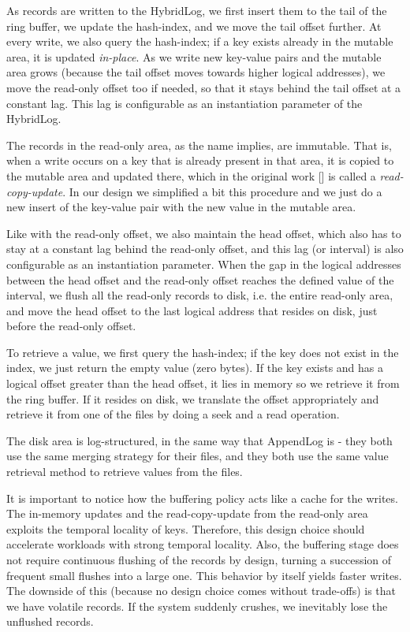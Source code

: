 \vspace{20px}

As records are written to the HybridLog, we first insert them to the tail of the ring buffer, we update the hash-index, and we move the tail offset further.
At every write, we also query the hash-index; if a key exists already in the mutable area, it is updated \textit{in-place}.
As we write new key-value pairs and the mutable area grows (because the tail offset moves towards higher logical addresses), we move the read-only offset too if needed, so that it stays behind the tail offset at a constant lag. This lag is configurable as an instantiation parameter of the HybridLog.

The records in the read-only area, as the name implies, are immutable. That is, when a write occurs on a key that is already present in that area, it is copied to the mutable area and updated there, which in the original work [\cite{faster}] is called a \textit{read-copy-update}. In our design we simplified a bit this procedure and we just do a new insert of the key-value pair with the new value in the mutable area.

Like with the read-only offset, we also maintain the head offset, which also has to stay at a constant lag behind the read-only offset, and this lag (or interval) is also configurable as an instantiation parameter.
When the gap in the logical addresses between the head offset and the read-only offset reaches the defined value of the interval, we flush all the read-only records to disk, i.e. the entire read-only area, and move the head offset to the last logical address that resides on disk, just before the read-only offset.

To retrieve a value, we first query the hash-index; if the key does not exist in the index, we just return the empty value (zero bytes). If the key exists and has a logical offset greater than the head offset, it lies in memory so we retrieve it from the ring buffer. If it resides on disk, we translate the offset appropriately and retrieve it from one of the files by doing a seek and a read operation.

The disk area is log-structured, in the same way that AppendLog is - they both use the same merging strategy for their files, and they both use the same value retrieval method to retrieve values from the files.

It is important to notice how the buffering policy acts like a cache for the writes.
The in-memory updates and the read-copy-update from the read-only area exploits the temporal locality of keys.
Therefore, this design choice should accelerate workloads with strong temporal locality. Also, the buffering stage does not require continuous flushing of the records by design, turning a succession of frequent small flushes into a large one. This behavior by itself yields faster writes. The downside of this (because no design choice comes without trade-offs) is that we have volatile records. If the system suddenly crushes, we inevitably lose the unflushed records.

